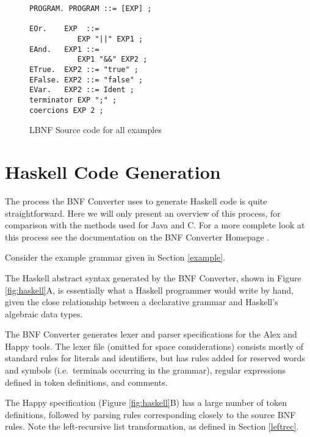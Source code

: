 \begin{figure}
\begin{center}
\begin{boxedminipage}[t]{6.3cm}
\begin{verbatim}
PROGRAM. PROGRAM ::= [EXP] ;

EOr.    EXP  ::= 
           EXP "||" EXP1 ;
EAnd.   EXP1 ::= 
           EXP1 "&&" EXP2 ;
ETrue.  EXP2 ::= "true" ;
EFalse. EXP2 ::= "false" ;
EVar.   EXP2 ::= Ident ;
terminator EXP ";" ;
coercions EXP 2 ;
\end{verbatim}
\end{boxedminipage}
\end{center}
\caption{LBNF Source code for all examples}
\label{fig:source}
\end{figure}

\section{Haskell Code Generation}

The process the BNF Converter uses to generate Haskell code is quite straightforward. Here we will only present an overview of this process, for comparison with the methods used for Java and C. For a more complete look at this process see the documentation on the BNF Converter Homepage \cite{bnfcsite}.


Consider the example grammar given in Section \ref{example}.

The Haskell abstract syntax generated by the
BNF Converter, shown in Figure \ref{fig:haskell}A, is essentially what a Haskell programmer would write by hand, given the close relationship between a declarative grammar and Haskell's algebraic data types.


The BNF Converter generates lexer and parser specifications for the Alex \cite{alex} and Happy \cite{happy} tools. The lexer file (omitted for space considerations) consists mostly of standard rules for literals and identifiers, but has
rules added for reserved words and symbols (i.e.\ terminals 
occurring in the grammar), regular expressions defined in token definitions, and comments. 

The Happy specification (Figure \ref{fig:haskell}B) has a large number of token definitions,
followed by parsing rules corresponding closely to the source BNF rules. Note the left-recursive list transformation, as defined in Section \ref{leftrec}.

